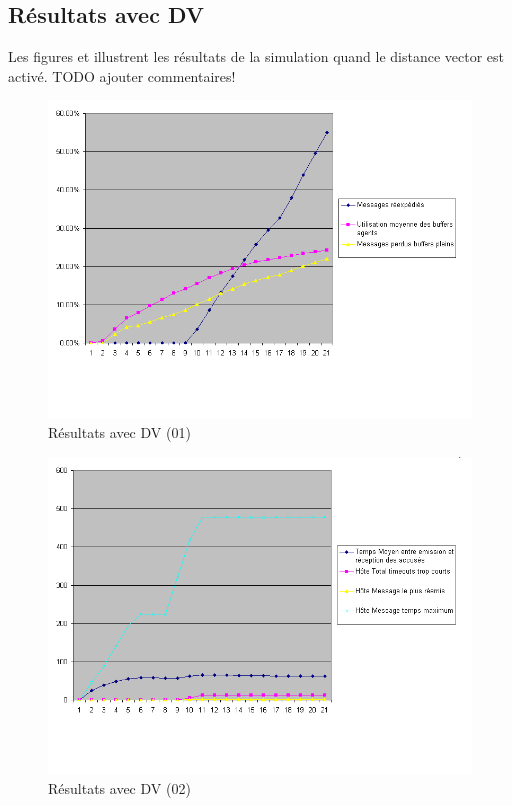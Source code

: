 \documentclass[a4paper,11pt]{article}
\begin{document}
\subsection{Résultats avec DV}
Les figures  et  illustrent les résultats de la simulation quand le distance vector est activé.
TODO ajouter commentaires!
\begin{figure}[h!t]
  \centering
    \includegraphics[scale=0.55]{avecdv1}
  \caption{Résultats avec DV (01)}
  \label{fig:avecdv01}
\end{figure}

\begin{figure}[h!t]
  \centering
    \includegraphics[scale=0.55]{avecdv2}
  \caption{Résultats avec DV (02)}
  \label{fig:avecdv02}
\end{figure}










\clearpage


\appendix
\end{document}
